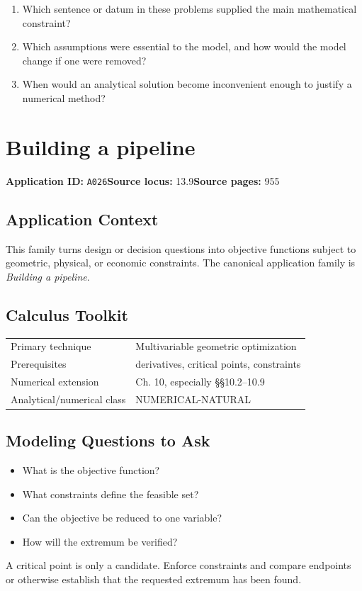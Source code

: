 \documentclass[11pt]{book}
\newcommand{\pid}[1]{\texttt{#1}}
\begin{document}
\begin{reflectionbox}\begin{enumerate}
\item Which sentence or datum in these problems supplied the main mathematical constraint?
\item Which assumptions were essential to the model, and how would the model change if one were removed?
\item When would an analytical solution become inconvenient enough to justify a numerical method?
\end{enumerate}\end{reflectionbox}
\chapter{Building a pipeline}\label{app:A026}
\textbf{Application ID:} \pid{A026}\quad \textbf{Source locus:} 13.9\quad \textbf{Source pages:} 955
\section*{Application Context}
This family turns design or decision questions into objective functions subject to geometric, physical, or economic constraints. The canonical application family is \emph{Building a pipeline}.
\section*{Calculus Toolkit}
\begin{tabularx}{\textwidth}{@{}lX@{}}\toprule
Primary technique & Multivariable geometric optimization \\
Prerequisites & derivatives, critical points, constraints \\
Numerical extension & Ch. 10, especially §§10.2–10.9 \\
Analytical/numerical class & NUMERICAL-NATURAL \\
\bottomrule\end{tabularx}
\section*{Modeling Questions to Ask}\begin{itemize}
\item What is the objective function?
\item What constraints define the feasible set?
\item Can the objective be reduced to one variable?
\item How will the extremum be verified?
\end{itemize}
\begin{errorbox}A critical point is only a candidate. Enforce constraints and compare endpoints or otherwise establish that the requested extremum has been found.\end{errorbox}
\end{document}
